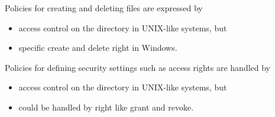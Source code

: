 \begin{frame}
  \begin{example}
    Policies for creating and deleting files are expressed by
    \begin{itemize}
      \item access control on the directory in UNIX-like systems, but
      \item specific create and delete right in Windows.
    \end{itemize}
  \end{example}

  \pause{}

  \begin{example}
    Policies for defining security settings such as access rights are handled 
    by
    \begin{itemize}
      \item access control on the directory in UNIX-like systems, but
      \item could be handled by right like grant and revoke.
    \end{itemize}
  \end{example}
\end{frame}



\begin{frame}
  \small
  \printbibliography{}
\end{frame}

